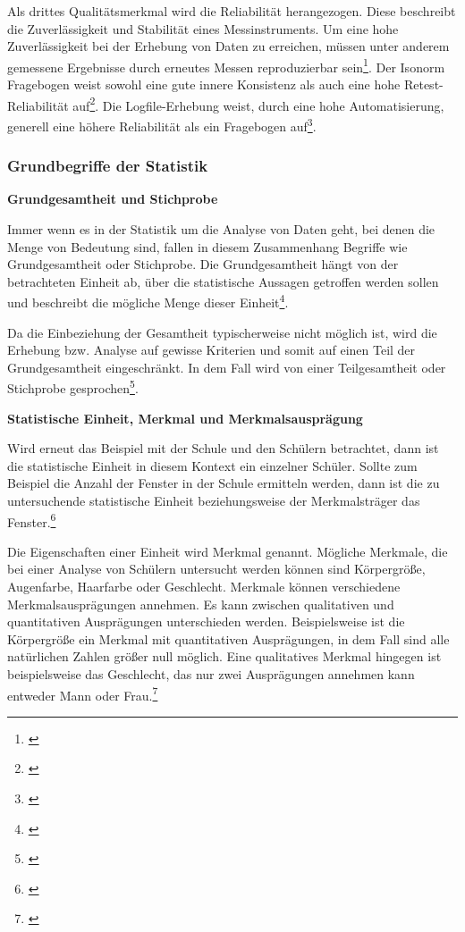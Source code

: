 Als drittes Qualitätsmerkmal wird die Reliabilität herangezogen. Diese beschreibt die Zuverlässigkeit und Stabilität eines Messinstruments. Um eine hohe Zuverlässigkeit bei der Erhebung von Daten zu erreichen, müssen unter anderem gemessene Ergebnisse durch erneutes Messen reproduzierbar sein\footnote{\cite[vgl.][Kap. 1]{Himme2007}}. Der Isonorm Fragebogen weist sowohl eine gute innere Konsistenz als auch eine hohe Retest-Reliabilität auf\footnote{\cite[vgl.][Kap. 3.5.3]{Figl2010}}. Die Logfile-Erhebung weist, durch eine hohe Automatisierung, generell eine höhere Reliabilität als ein Fragebogen auf\footnote{\cite[vgl.][Kap. 65.3]{Baur2014}}.


\subsubsection{Grundbegriffe der Statistik}
\textbf{Grundgesamtheit und Stichprobe}

Immer wenn es in der Statistik um die Analyse von Daten geht, bei denen die Menge von Bedeutung sind, fallen in diesem Zusammenhang Begriffe wie Grundgesamtheit oder Stichprobe. Die Grundgesamtheit hängt von der betrachteten Einheit ab, über die statistische Aussagen getroffen werden sollen und beschreibt die mögliche Menge dieser Einheit\footnote{\cite[vgl.][13]{Statistik2016}}.

Da die Einbeziehung der Gesamtheit typischerweise nicht möglich ist, wird die Erhebung bzw. Analyse auf gewisse Kriterien und somit auf einen Teil der Grundgesamtheit eingeschränkt. In dem Fall wird von einer Teilgesamtheit oder Stichprobe gesprochen\footnote{\cite[vgl.][13]{Statistik2016}}.

\textbf{Statistische Einheit, Merkmal und Merkmalsausprägung}

Wird erneut das Beispiel mit der Schule und den Schülern betrachtet, dann ist die statistische Einheit in diesem Kontext ein einzelner Schüler. Sollte zum Beispiel die Anzahl der Fenster in der Schule ermitteln werden, dann ist die zu untersuchende statistische Einheit beziehungsweise der Merkmalsträger das Fenster.\footnote{\cite[vgl.][13]{Statistik2016}}

Die Eigenschaften einer Einheit wird Merkmal genannt. Mögliche Merkmale, die bei einer Analyse von Schülern untersucht werden können sind Körpergröße, Augenfarbe, Haarfarbe oder Geschlecht. Merkmale können verschiedene Merkmalsausprägungen annehmen. Es kann zwischen qualitativen und quantitativen Ausprägungen unterschieden werden. Beispielsweise ist die Körpergröße ein Merkmal mit quantitativen Ausprägungen, in dem Fall sind alle natürlichen Zahlen größer null möglich. Eine qualitatives Merkmal hingegen ist beispielsweise das Geschlecht, das nur zwei Ausprägungen annehmen kann entweder Mann oder Frau.\footnote{\cite[vgl.][13\psqq]{Statistik2016}}

